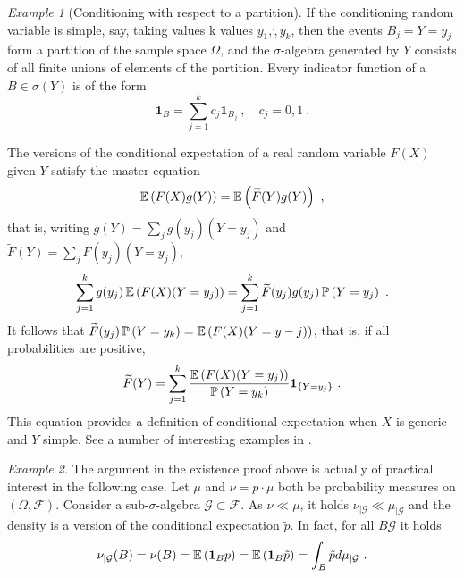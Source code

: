 \documentclass[12pt,a4paper]{amsart}
\newcommand{\one}{\bm 1}
\theoremstyle{plain}%
\theoremstyle{definition}
\theoremstyle{remark}
\newtheorem{example}{Example}
\begin{document}
\begin{example}[Conditioning with respect to a partition] If the
  conditioning random variable is simple, say, taking values k values
  $y_1, \dot,y_k$, then the events $B_j={Y=y_j}$ form a partition of
  the sample space $\Omega$, and the $\sigma$-algebra generated by $Y$
  consists of all finite unions of elements of the partition. Every
  indicator function of a $B \in \sigma(Y)$ is of the form
  \begin{equation*}
    \one_B = \sum_{j=1}^k c_j \one_{B_j} \ , \quad c_j = 0,1 \ .
  \end{equation*}

The versions of the conditional expectation of a real random variable
$F(X)$ given $Y$ satisfy the master equation
\begin{equation*}
  \operatorname{\mathbb E}\left(F(X)g(Y)\right) = \operatorname{\mathbb E}\left(\widetilde F(Y)g(Y)\right) \ , 
\end{equation*}
that is, writing $g(Y) = \sum_j g(y_j)(Y=y_j)$ and $\widetilde F(Y) =
\sum_j F(y_j) (Y = y_j)$, 
\begin{equation*}
    \sum_{j=1}^k g(y_j) \operatorname{\mathbb E}\left(F(X)(Y=y_j)\right) = \sum_{j=1}^k \widetilde
  F(y_j) g(y_j) \operatorname{\mathbb P}\left(Y=y_j\right) \ .
\end{equation*}
  It follows that $\widetilde F(y_j) \operatorname{\mathbb P}\left(Y= y_k\right) =
  \operatorname{\mathbb E}\left(F(X)(Y=y-j)\right)$, that is, if all probabilities are positive,
  \begin{equation*}
    \widetilde F(Y) = \sum_{j=1}^k
    \frac{\expectof{F(X)(Y=y_j)}}{\probof{Y= y_k}}\one_{\set{Y=y_j}}\ . 
  \end{equation*}
This equation provides a definition of conditional expectation when
$X$ is generic and $Y$ simple. See a number of interesting examples in \cite[Ch.~3]{ross:2010introduction10}.
\end{example}

\begin{example} The argument in the existence proof above is actually of
  practical interest in the following case. Let $\mu$ and
  $\nu = p \cdot \mu$ both be probability measures on
  $(\Omega,\mathcal F)$. Consider a sub-$\sigma$-algebra
  $\mathcal G \subset \mathcal F$. As $\nu \ll \mu$, it holds
  $\nu_{|\mathcal G} \ll \mu_{|\mathcal G}$ and the density is a
  version of the conditional expectation $\widetilde p$. In fact, for
  all $B \mathcal G$ it holds
  \begin{equation*}
    \nu_{|\mathcal G}(B) = \nu(B) = \expectof{\one_B p} =
    \expectof{\one_B \tilde p} = \int_B \tilde p d\mu_{|\mathcal G} \ .
  \end{equation*}
\end{example}
\end{document}
